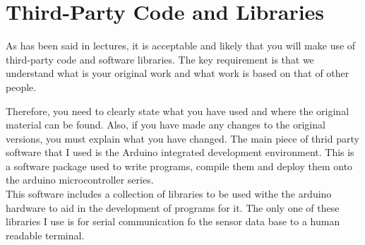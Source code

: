\chapter{Third-Party Code and Libraries}


As has been said in lectures, it is acceptable and likely that you will make use of third-party code and software libraries. The key requirement is that we understand what is your original work and what work is based on that of other people. 

Therefore, you need to clearly state what you have used and where the original material can be found. Also, if you have made any changes to the original versions, you must explain what you have changed.
The main piece of thrid party software that I used is the Arduino integrated development environment.  This is a software package used to write programs, compile them and deploy them onto the arduino microcontroller series.
\\This software includes a collection of libraries to be used withe the arduino hardware to aid in the development of programs for it.  The only one of these libraries I use is for serial communication fo the sensor data base to a human readable terminal.
